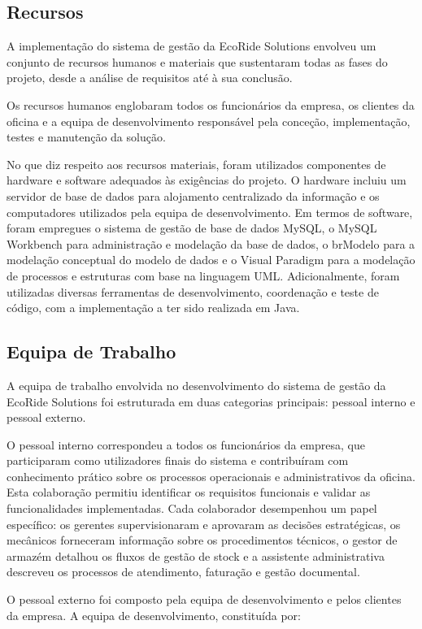 \documentclass[a4paper,12pt]{scrreprt}
\begin{document}
\subsection{Recursos}

A implementação do sistema de gestão da EcoRide Solutions envolveu um conjunto de recursos humanos e materiais que sustentaram todas as fases do projeto, desde a análise de requisitos até à sua conclusão.

Os recursos humanos englobaram todos os funcionários da empresa, os clientes da oficina e a equipa de desenvolvimento responsável pela conceção, implementação, testes e manutenção da solução.

No que diz respeito aos recursos materiais, foram utilizados componentes de hardware e software adequados às exigências do projeto. O hardware incluiu um servidor de base de dados para alojamento centralizado da informação e os computadores utilizados pela equipa de desenvolvimento. Em termos de software, foram empregues o sistema de gestão de base de dados MySQL, o MySQL Workbench para administração e modelação da base de dados, o brModelo para a modelação conceptual do modelo de dados e o Visual Paradigm para a modelação de processos e estruturas com base na linguagem UML. Adicionalmente, foram utilizadas diversas ferramentas de desenvolvimento, coordenação e teste de código, com a implementação a ter sido realizada em Java.

\subsection{Equipa de Trabalho}
A equipa de trabalho envolvida no desenvolvimento do sistema de gestão da EcoRide Solutions foi estruturada em duas categorias principais: pessoal interno e pessoal externo.

O pessoal interno correspondeu a todos os funcionários da empresa, que participaram como utilizadores finais do sistema e contribuíram com conhecimento prático sobre os processos operacionais e administrativos da oficina. Esta colaboração permitiu identificar os requisitos funcionais e validar as funcionalidades implementadas. Cada colaborador desempenhou um papel específico: os gerentes supervisionaram e aprovaram as decisões estratégicas, os mecânicos forneceram informação sobre os procedimentos técnicos, o gestor de armazém detalhou os fluxos de gestão de stock e a assistente administrativa descreveu os processos de atendimento, faturação e gestão documental.

O pessoal externo foi composto pela equipa de desenvolvimento e pelos clientes da empresa. A equipa de desenvolvimento, constituída por:
\end{document}

